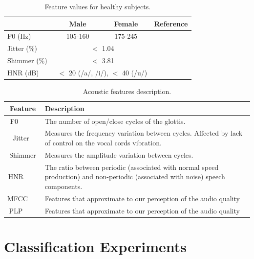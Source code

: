\begin{table}[!htb]
	\renewcommand{\arraystretch}{1.3} %
	\centering
	\begin{tabular}{lccc}
		~       & Male & Female & Reference \\ \hline
		F0 (Hz)      & 105-160 & 175-245 & \cite{f0_values}\\  \hline
		Jitter (\%)  & \multicolumn{2}{c}{ $<$ 1.04  } & \cite{jitter_shimmer_values} \\  \hline
		Shimmer (\%) & \multicolumn{2}{c}{ $<$ 3.81 } & \cite{jitter_shimmer_values} \\ \hline
		HNR (dB)     & \multicolumn{2}{c}{ $<$ 20 (/a/, /i/), $<$ 40 (/u/) } & \cite{hnr_values} \\
	\end{tabular}
	\caption[Feature values for healthy subjects.]{Feature values for healthy subjects.}
	\label{normalValues}
\end{table}

\begin{table}[!htb]
	\renewcommand{\arraystretch}{1.4} %
	\centering
	\begin{tabular}{cL}
		\textbf{Feature} & \textbf{Description} \\ \hline
		F0      & The number of open/close cycles of the glottis. \\  \hline
		Jitter  & Measures the frequency variation between cycles. Affected by lack of control on the vocal cords vibration. \\  \hline
		Shimmer & Measures the amplitude variation between cycles. \\ \hline 
		HNR     & The ratio between periodic (associated with normal speed production) and non-periodic (associated with noise) speech components. \\  \hline
		MFCC    & Features that approximate to our perception of the audio quality \\  \hline
		PLP     & Features that approximate to our perception of the audio quality \\
	\end{tabular}
	\caption[Acoustic features description.]{Acoustic features description.}
	\label{featureDescription}
\end{table}

\section{Classification Experiments}

